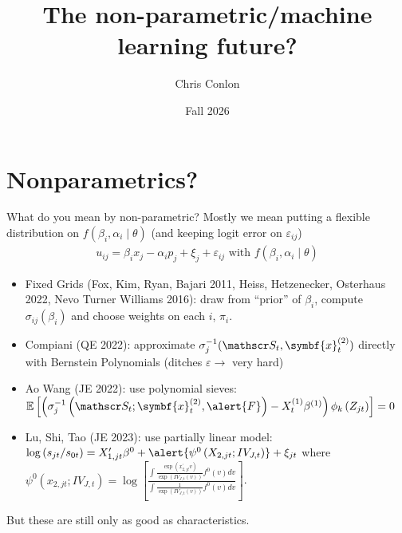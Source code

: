 \documentclass[aspectratio=169,10pt]{beamer}
\title{The non-parametric/machine learning future?}
\author{Chris Conlon}
\institute{NYU Stern}
\date{Fall 2026}
\begin{document}
\begin{frame}
\titlepage
\end{frame}


\section*{Nonparametrics?}


\begin{frame}{What do you mean by non-parametric?}
Mostly we mean putting a flexible distribution on $f(\beta_i,\alpha_i \mid \theta)$ (and keeping logit error on $\varepsilon_{ij}$)
\begin{align*}
u_{ij} = \beta_i x_j - \alpha_i p_j + \xi_j + \varepsilon_{ij} \text{ with } f(\beta_i,\alpha_i \mid \theta)
\end{align*}
\begin{itemize}
    \item Fixed Grids (Fox, Kim, Ryan, Bajari 2011, Heiss, Hetzenecker, Osterhaus 2022, Nevo Turner Williams 2016): draw from ``prior'' of $\beta_i$, compute $\sigma_{ij}(\beta_i)$ and choose weights on each $i$, $\pi_i$.
    \item Compiani (QE 2022): approximate $\sigma_{j}^{-1}(\calS_t,\symbf{x}_t^{(2)})$ directly with Bernstein Polynomials (ditches $\varepsilon \rightarrow$ very hard)
    \item Ao Wang (JE 2022): use polynomial sieves: $\mathbb{E}\left[\left(\sigma_j^{-1}\left(\calS_t ; \symbf{x}_t^{(2)}, \alert{F}\right)-X_t^{(1)} \beta^{(1)}\right) \phi_k\left(Z_{j t}\right)\right]=0$
    \item Lu, Shi, Tao (JE 2023): use partially linear model: $\log \left(s_{j t} / s_{0 t}\right)=X_{1, j t}^{\prime} \beta^0+\alert{\psi^0\left(X_{2, j t} ; IV_{J, t}\right)}+\xi_{j t}$ where        $\psi^0\left(x_{2, j t} ; IV_{J, t}\right)=\log \left[\frac{\int \frac{\exp \left(x_{2, j t}^{\prime} v\right)}{\exp \left(IV_{J, t}(v)\right)} f^0(v) d v}{\int \frac{1}{\exp \left(IV_{J, t}(v)\right)} f^0(v) d v}\right]$.
\end{itemize}
But these are still \alert{only as good as characteristics}.
\end{frame}
\end{document}
